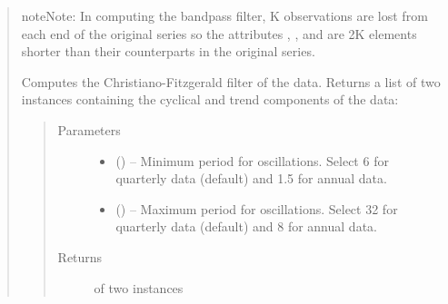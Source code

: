 \documentclass[letterpaper,10pt,openany,oneside,english]{sphinxmanual}
\begin{document}
\begin{fulllineitems}
\begin{quote}
\begin{fulllineitems}
\begin{quote}
\begin{description}
\end{description}\end{quote}

\begin{sphinxadmonition}{note}{Note:}
In computing the bandpass filter, K observations are lost from each end of the original series so the attributes , , and  are 2K elements shorter than their counterparts in the original series.
\end{sphinxadmonition}

\end{fulllineitems}


\begin{fulllineitems}
\label{\detokenize{series_class:fredpy.series.cffilter}}
Computes the Christiano-Fitzgerald filter of the data. Returns a list of two {\hyperref[\detokenize{series_class:fredpy.series}]{}} instances containing the cyclical and trend components of the data:
\begin{quote}

\end{quote}
\begin{quote}\begin{description}
\item[{Parameters}] \leavevmode\begin{itemize}
\item {} 
 (\href{https://docs.python.org/2/library/functions.html\#int}{}) -- Minimum period for oscillations. Select 6 for quarterly data (default) and 1.5 for annual data.

\item {} 
 (\href{https://docs.python.org/2/library/functions.html\#int}{}) -- Maximum period for oscillations. Select 32 for quarterly data (default) and 8 for annual data.

\end{itemize}

\item[{Returns}] \leavevmode
\href{https://docs.python.org/2/library/functions.html\#list}{} of two {\hyperref[\detokenize{series_class:fredpy.series}]{}} instances


\end{description}
\end{quote}
\end{fulllineitems}
\end{quote}
\end{fulllineitems}
\end{document}
